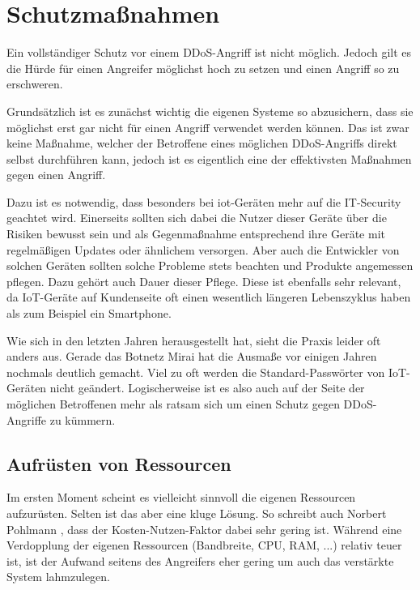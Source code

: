 \chapter{Schutzmaßnahmen}
\label{chap:kapitel3}
Ein vollständiger Schutz vor einem DDoS-Angriff ist nicht möglich. Jedoch gilt es die Hürde für einen Angreifer möglichst hoch zu setzen und einen Angriff so zu erschweren.

Grundsätzlich ist es zunächst wichtig die eigenen Systeme so abzusichern, dass sie möglichst erst gar nicht für einen Angriff verwendet werden können. Das ist zwar keine Maßnahme, welcher der Betroffene eines möglichen DDoS-Angriffs direkt selbst durchführen kann, jedoch ist es eigentlich eine der effektivsten Maßnahmen gegen einen Angriff.

Dazu ist es notwendig, dass besonders bei \ac{iot}-Geräten mehr auf die IT-Security geachtet wird. Einerseits sollten sich dabei die Nutzer dieser Geräte über die Risiken bewusst sein und als Gegenmaßnahme entsprechend ihre Geräte mit regelmäßigen Updates oder ähnlichem versorgen.
Aber auch die Entwickler von solchen Geräten sollten solche Probleme stets beachten und Produkte angemessen pflegen. Dazu gehört auch Dauer dieser Pflege. Diese ist ebenfalls sehr relevant, da IoT-Geräte auf Kundenseite oft einen wesentlich längeren Lebenszyklus haben als zum Beispiel ein Smartphone.

Wie sich in den letzten Jahren herausgestellt hat, sieht die Praxis leider oft anders aus. Gerade das Botnetz \glqq Mirai\grqq{} hat die Ausmaße vor einigen Jahren nochmals deutlich gemacht. Viel zu oft werden die Standard-Passwörter von IoT-Geräten nicht geändert.
Logischerweise ist es also auch auf der Seite der möglichen Betroffenen mehr als ratsam sich um einen Schutz gegen DDoS-Angriffe zu kümmern.

\section{Aufrüsten von Ressourcen}
\label{sec:k3rsc}
Im ersten Moment scheint es vielleicht sinnvoll die eigenen Ressourcen aufzurüsten. Selten ist das aber eine kluge Lösung. So schreibt auch Norbert Pohlmann \cite{Pohlmann2019}, dass der Kosten-Nutzen-Faktor dabei sehr gering ist. Während eine Verdopplung der eigenen Ressourcen (Bandbreite, CPU, RAM, ...) relativ teuer ist, ist der Aufwand seitens des Angreifers eher gering um auch das verstärkte System lahmzulegen.

